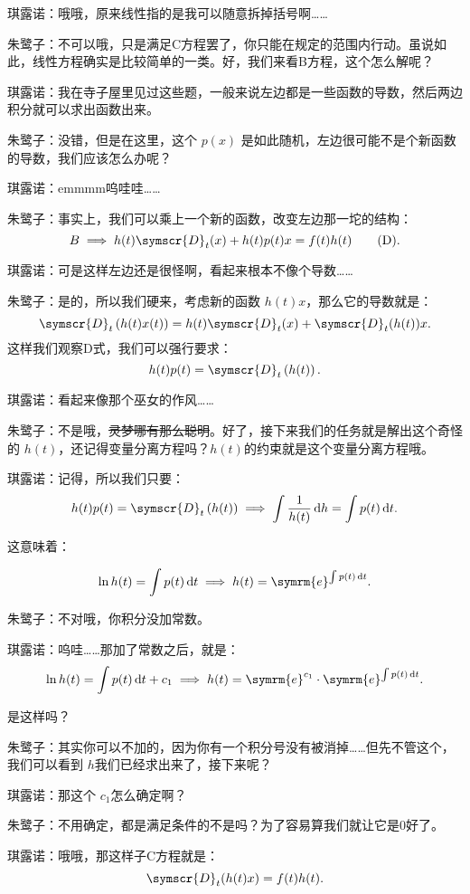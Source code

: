 \documentclass{ctexart}
\newcommand{\dx}{\symscr{D} _t (x)}
\begin{document}
琪露诺：哦哦，原来线性指的是我可以随意拆掉括号啊……

朱鹭子：不可以哦，只是满足C方程罢了，你只能在规定的范围内行动。虽说如此，线性方程确实是比较简单的一类。好，我们来看B方程，这个怎么解呢？

琪露诺：我在寺子屋里见过这些题，一般来说左边都是一些函数的导数，然后两边积分就可以求出函数出来。

朱鹭子：没错，但是在这里，这个 \(p(x)\) 是如此随机，左边很可能不是个新函数的导数，我们应该怎么办呢？

琪露诺：emmmm呜哇哇……

朱鹭子：事实上，我们可以乘上一个新的函数，改变左边那一坨的结构：
\[
    B \implies h(t)\dx{}+h(t)p(t)x=f(t)h(t)\tag{D}
    .\]

琪露诺：可是这样左边还是很怪啊，看起来根本不像个导数……

朱鹭子：是的，所以我们硬来，考虑新的函数 \(h(t)x\)，那么它的导数就是：
\[
    \symscr{D} _t\left( h(t) x(t)  \right)= h(t) \dx +\symscr{D} _t(h(t))x
    .\]
这样我们观察D式，我们可以强行要求：
\[
    h(t)p(t)=\symscr{D} _t\left( h(t) \right)
    .\]

琪露诺：看起来像那个巫女的作风……

朱鹭子：不是哦，\sout{灵梦哪有那么聪明}。好了，接下来我们的任务就是解出这个奇怪的 \(h(t)\)，还记得变量分离方程吗？\(h(t)\)的约束就是这个变量分离方程哦。

琪露诺：记得，所以我们只要：
\[
    h(t)p(t)=\symscr{D} _t\left( h(t) \right) \implies \int \frac{1}{h(t)} \,\mathrm{d}h =\int p(t) \,\mathrm{d}t
    .\]

这意味着：

\[
    \ln h(t)= \int p(t) \,\mathrm{d}t \implies h(t)=\symrm{e} ^{\int p(t) \,\mathrm{d}t }
    .\]

朱鹭子：不对哦，你积分没加常数。

琪露诺：呜哇……那加了常数之后，就是：
\[
    \ln h(t)= \int p(t) \,\mathrm{d}t +c_1\implies h(t)=\symrm{e} ^{c_1}\cdot \symrm{e} ^{\int p(t) \,\mathrm{d}t }
    .\]

是这样吗？

朱鹭子：其实你可以不加的，因为你有一个积分号没有被消掉……但先不管这个，我们可以看到 \(h\)我们已经求出来了，接下来呢？

琪露诺：那这个  \(c_1\)怎么确定啊？

朱鹭子：不用确定，都是满足条件的不是吗？为了容易算我们就让它是0好了。

琪露诺：哦哦，那这样子C方程就是：
\[
    \symscr{D} _t(h(t)x)=f(t)h(t)
    .\]
\end{document}
